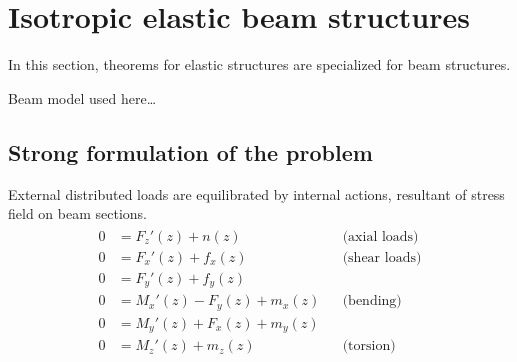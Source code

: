 \documentclass[letterpaper,10pt,english]{jupyterBook}
\begin{document}
\sphinxstepscope


\section{Isotropic elastic beam structures}
\label{\detokenize{ch/solids/small-displacements-statics-beams-weak-form:isotropic-elastic-beam-structures}}\label{\detokenize{ch/solids/small-displacements-statics-beams-weak-form:solid-mechanics-intro-small-displacements-statics-beam-weak-form}}\label{\detokenize{ch/solids/small-displacements-statics-beams-weak-form::doc}}
\sphinxAtStartPar
In this section, theorems for elastic structures are specialized for beam structures.

\sphinxAtStartPar
{} Beam model used here…


\subsection{Strong formulation of the problem}
\label{\detokenize{ch/solids/small-displacements-statics-beams-weak-form:strong-formulation-of-the-problem}}\label{\detokenize{ch/solids/small-displacements-statics-beams-weak-form:solid-mechanics-intro-small-displacements-statics-beam-weak-form-strong}}
\sphinxAtStartPar
{} External distributed loads are equilibrated by internal actions, resultant of stress field on beam sections.
\begin{equation*}
\begin{split}\begin{aligned}
  0 & = F_z'(z) + n(z)             && \text{(axial loads)} \\
  0 & = F_x'(z) + f_x(z)           && \text{(shear loads)} \\
  0 & = F_y'(z) + f_y(z)           &&                      \\
  0 & = M_x'(z) - F_y(z) + m_x(z)  && \text{(bending)}     \\
  0 & = M_y'(z) + F_x(z) + m_y(z)  &&                      \\
  0 & = M_z'(z) + m_z(z)           && \text{(torsion)}     \\
\end{aligned}\end{split}
\end{equation*}
\sphinxAtStartPar
{}
\end{document}

